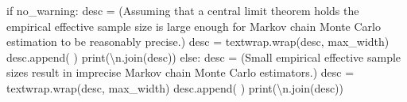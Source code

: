 \documentclass[
  letterpaper,
  DIV=11,
  numbers=noendperiod]{scrartcl}
\newenvironment{Shaded}{\begin{snugshade}}{\end{snugshade}}
\newcommand{\BuiltInTok}[1]{\textcolor[rgb]{0.00,0.23,0.31}{#1}}
\newcommand{\CharTok}[1]{\textcolor[rgb]{0.13,0.47,0.30}{#1}}
\newcommand{\ControlFlowTok}[1]{\textcolor[rgb]{0.00,0.23,0.31}{#1}}
\newcommand{\NormalTok}[1]{\textcolor[rgb]{0.00,0.23,0.31}{#1}}
\newcommand{\OperatorTok}[1]{\textcolor[rgb]{0.37,0.37,0.37}{#1}}
\newcommand{\StringTok}[1]{\textcolor[rgb]{0.13,0.47,0.30}{#1}}
\begin{document}
\begin{Shaded}
\begin{Highlighting}[]
  \ControlFlowTok{if}\NormalTok{ no\_warning:}
\NormalTok{    desc }\OperatorTok{=}\NormalTok{ (}\StringTok{\textquotesingle{}Assuming that a central limit theorem holds the \textquotesingle{}}
            \StringTok{\textquotesingle{}empirical effective sample size is large enough \textquotesingle{}}
            \StringTok{\textquotesingle{}for Markov chain Monte Carlo estimation to be\textquotesingle{}}
            \StringTok{\textquotesingle{}reasonably precise.\textquotesingle{}}\NormalTok{)}
\NormalTok{    desc }\OperatorTok{=}\NormalTok{ textwrap.wrap(desc, max\_width)}
\NormalTok{    desc.append(}\StringTok{\textquotesingle{} \textquotesingle{}}\NormalTok{)}
    \BuiltInTok{print}\NormalTok{(}\StringTok{\textquotesingle{}}\CharTok{\textbackslash{}n}\StringTok{\textquotesingle{}}\NormalTok{.join(desc))}
  \ControlFlowTok{else}\NormalTok{:}
\NormalTok{    desc }\OperatorTok{=}\NormalTok{ (}\StringTok{\textquotesingle{}Small empirical effective sample sizes result in \textquotesingle{}}
            \StringTok{\textquotesingle{}imprecise Markov chain Monte Carlo estimators.\textquotesingle{}}\NormalTok{)}
\NormalTok{    desc }\OperatorTok{=}\NormalTok{ textwrap.wrap(desc, max\_width)}
\NormalTok{    desc.append(}\StringTok{\textquotesingle{} \textquotesingle{}}\NormalTok{)}
    \BuiltInTok{print}\NormalTok{(}\StringTok{\textquotesingle{}}\CharTok{\textbackslash{}n}\StringTok{\textquotesingle{}}\NormalTok{.join(desc))}

\end{Highlighting}
\end{Shaded}
\end{document}

